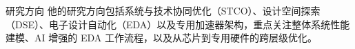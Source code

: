 \begin{rubric}{研究方向}
%
%
%
\entry*[]
他的研究方向包括系统与技术协同优化（STCO）、设计空间探索（DSE）、电子设计自动化（EDA）以及专用加速器架构，重点关注整体系统性能建模、AI 增强的 EDA 工作流程，以及从芯片到专用硬件的跨层级优化。
\end{rubric}
